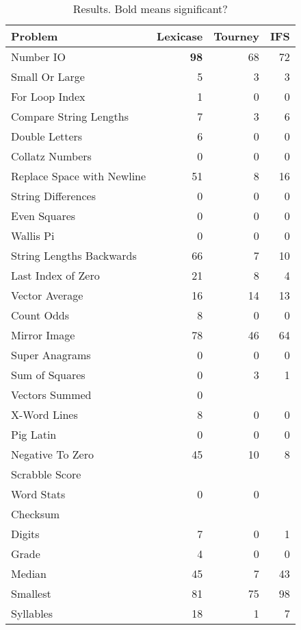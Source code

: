 \documentclass{sig-alternate}
\begin{document}
\begin{table}[h]
\centering
\caption{Results. Bold means significant?}
\begin{tabular}{|l|rrr|}
\hline
Problem                    & Lexicase & Tourney & IFS \\
\hline
Number IO                  & \textbf{98}       & 68      & 72  \\
Small Or Large             & 5        & 3       & 3   \\
For Loop Index             & 1        & 0       & 0   \\
Compare String Lengths     & 7        & 3       & 6   \\
Double Letters             & 6        & 0       & 0   \\
Collatz Numbers            & 0        & 0       & 0   \\
Replace Space with Newline & 51       & 8       & 16  \\
String Differences         & 0        & 0       & 0   \\
Even Squares               & 0        & 0       & 0   \\
Wallis Pi                  & 0        & 0       & 0   \\
String Lengths Backwards   & 66       & 7       & 10  \\
Last Index of Zero         & 21       & 8       & 4   \\
Vector Average             & 16       & 14      & 13  \\
Count Odds                 & 8        & 0       & 0   \\
Mirror Image               & 78       & 46      & 64  \\
Super Anagrams             & 0        & 0       & 0   \\
Sum of Squares             & 0        & 3       & 1   \\
Vectors Summed             & 0        &         &     \\
X-Word Lines               & 8        & 0       & 0   \\
Pig Latin                  & 0        & 0       & 0   \\
Negative To Zero           & 45       & 10      & 8   \\
Scrabble Score             &          &         &     \\
Word Stats                 & 0        & 0       &     \\
Checksum                   &          &         &     \\
Digits                     & 7        & 0       & 1   \\
Grade                      & 4        & 0       & 0   \\
Median                     & 45       & 7       & 43  \\
Smallest                   & 81       & 75      & 98  \\
Syllables                  & 18       & 1       & 7   \\
\hline
\end{tabular}
\end{table}
\end{document}
